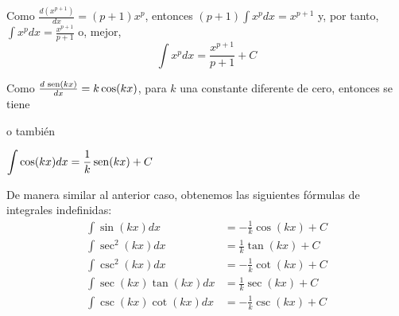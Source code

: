 \begin{parrafonumerado}

\item Como $\frac{d(x^{p+1})}{dx}= (p+1)x^{p}$, entonces $(p+1) \int x^{p}dx=x^{p+1}$ y, por tanto, $\int x^{p}dx=\frac{x^{p+1}}{p+1}$ o, mejor,
  \[
    \int x^{p}dx=\frac{x^{p+1}}{p+1}+C
  \]

\item Como $\frac{d\, \operatorname{sen} (kx)}{dx}=k\cos (kx)$, para $k$ una constante diferente de cero, entonces se tiene


  o también
  \begin{center}
    $\displaystyle{\int \cos (kx)dx=\frac{1}{k}\operatorname{sen}(kx)+C}$
  \end{center}

\item De manera similar al anterior caso, obtenemos las siguientes fórmulas de integrales indefinidas:
  {\small
    \begin{align*}
      \int \sin (kx)dx&=-\frac{1}{k}\cos (kx)+C\\
      \int \sec ^{2}(kx)dx&=\frac{1}{k}\tan (kx)+C\\
      \int \csc ^{2}(kx)dx&=-\frac{1}{k}\cot (kx)+C\\
      \int \sec (kx) \tan (kx)dx&=\frac{1}{k}\sec (kx)+C\\
      \int \csc (kx) \cot (kx)dx&=-\frac{1}{k}\csc (kx)+C
    \end{align*}
  }


\end{parrafonumerado}
